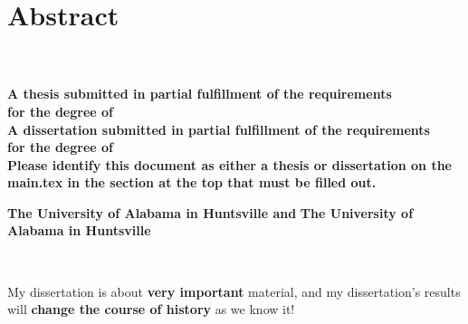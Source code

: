 
\chapter{Abstract}
     \begin{center}
        \large
        \singlespacing
        \textbf{\thesistitle}\\
        \vspace{0.5cm}
        \large
        \textbf{\studentname}\\
        \vspace{0.5cm}
        \normalsize
        \ifdefined\thesis
        \textbf{A thesis submitted in partial fulfillment of the requirements \\for the degree of \degree}\\  
        \else
        \ifdefined\dissertation
        \textbf{A dissertation submitted in partial fulfillment of the requirements \\for the degree of \degree}\\ 
        \else
        \textbf{Please identify this document as either a thesis or dissertation on the main.tex in the section at the top that must be filled out.}\\
    \fi
    \fi
        \vspace{1cm}
        \textbf{\department}
        
        \vspace{0.25cm}

        \ifdefined\jointuni
        \textbf{The University of Alabama in Huntsville and  \jointuni}
        \else
        \textbf{The University of Alabama in Huntsville}
    \fi

        
        \vspace{0.1cm}
        \textbf{\gradmonth\ \gradyear}
        


    \end{center}
\vspace{0.1cm}

\doublespacing
My dissertation is about \textbf{very important} material, and my dissertation’s results will \textbf{change the course of history} as we know it!

\clearpage

